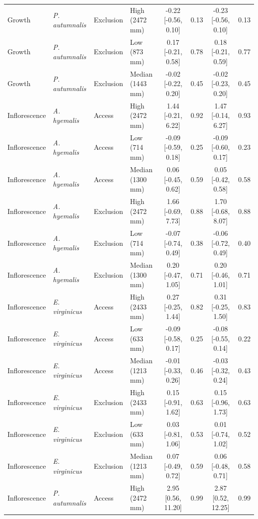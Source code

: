 \begin{landscape}
\begin{longtable}{llllcccc}
  Growth & \textit{P. autumnalis} & Exclusion & High (2472 mm) & -0.22 [-0.56, 0.10] & 0.13 & -0.23 [-0.56, 0.10] & 0.13 \\
  Growth & \textit{P. autumnalis} & Exclusion & Low (873 mm) & 0.17 [-0.21, 0.58] & 0.78 & 0.18 [-0.21, 0.59] & 0.77 \\
  Growth & \textit{P. autumnalis} & Exclusion & Median (1443 mm) & -0.02 [-0.22, 0.20] & 0.45 & -0.02 [-0.23, 0.20] & 0.45 \\
  Inflorescence & \textit{A. hyemalis} & Access & High (2472 mm) & 1.44 [-0.21, 6.22] & 0.92 & 1.47 [-0.14, 6.27] & 0.93 \\
  Inflorescence & \textit{A. hyemalis} & Access & Low (714 mm) & -0.09 [-0.59, 0.18] & 0.25 & -0.09 [-0.60, 0.17] & 0.23 \\
  Inflorescence & \textit{A. hyemalis} & Access & Median (1300 mm) & 0.06 [-0.45, 0.62] & 0.59 & 0.05 [-0.42, 0.58] & 0.58 \\
  Inflorescence & \textit{A. hyemalis} & Exclusion & High (2472 mm) & 1.66 [-0.69, 7.73] & 0.88 & 1.70 [-0.68, 8.07] & 0.88 \\
  Inflorescence & \textit{A. hyemalis} & Exclusion & Low (714 mm) & -0.07 [-0.74, 0.49] & 0.38 & -0.06 [-0.72, 0.49] & 0.40 \\
  Inflorescence & \textit{A. hyemalis} & Exclusion & Median (1300 mm) & 0.20 [-0.47, 1.05] & 0.71 & 0.20 [-0.46, 1.01] & 0.71 \\
  Inflorescence & \textit{E. virginicus} & Access & High (2433 mm) & 0.27 [-0.25, 1.44] & 0.82 & 0.31 [-0.25, 1.50] & 0.83 \\
  Inflorescence & \textit{E. virginicus} & Access & Low (633 mm) & -0.09 [-0.58, 0.17] & 0.25 & -0.08 [-0.55, 0.14] & 0.22 \\
  Inflorescence & \textit{E. virginicus} & Access & Median (1213 mm) & -0.01 [-0.33, 0.26] & 0.46 & -0.03 [-0.32, 0.24] & 0.43 \\
  Inflorescence & \textit{E. virginicus} & Exclusion & High (2433 mm) & 0.15 [-0.91, 1.62] & 0.63 & 0.15 [-0.96, 1.73] & 0.63 \\
  Inflorescence & \textit{E. virginicus} & Exclusion & Low (633 mm) & 0.03 [-0.81, 1.06] & 0.53 & 0.01 [-0.74, 1.02] & 0.52 \\
  Inflorescence & \textit{E. virginicus} & Exclusion & Median (1213 mm) & 0.07 [-0.49, 0.72] & 0.59 & 0.06 [-0.48, 0.71] & 0.58 \\
  Inflorescence & \textit{P. autumnalis} & Access & High (2472 mm) & 2.95 [0.56, 11.20] & 0.99 & 2.87 [0.52, 12.25] & 0.99 \\

\end{longtable}
\end{landscape}
